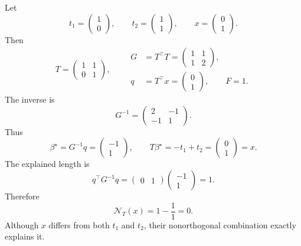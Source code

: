 \documentclass[10pt,twocolumn]{article}
\newcommand{\nov}{\mathcal N}
\begin{document}
Let
\begin{equation}
t_1=\begin{pmatrix}1\\0\end{pmatrix},
\qquad
t_2=\begin{pmatrix}1\\1\end{pmatrix},
\qquad
x=\begin{pmatrix}0\\1\end{pmatrix}.
\end{equation}
Then
\begin{equation}
T=\begin{pmatrix}1&1\\0&1\end{pmatrix},
\qquad
\begin{aligned}
G&=T^\top T=\begin{pmatrix}1&1\\1&2\end{pmatrix},\\
q&=T^\top x=\begin{pmatrix}0\\1\end{pmatrix},
\qquad F=1.
\end{aligned}
\end{equation}
The inverse is
\begin{equation}
G^{-1}=\begin{pmatrix}2&-1\\-1&1\end{pmatrix}.
\end{equation}
Thus
\begin{equation}
\beta^\star=G^{-1}q
=\begin{pmatrix}-1\\1\end{pmatrix},
\qquad
T\beta^\star
= -t_1+t_2
=\begin{pmatrix}0\\1\end{pmatrix}=x.
\end{equation}
The explained length is
\begin{equation}
q^\top G^{-1}q
=\begin{pmatrix}0&1\end{pmatrix}
\begin{pmatrix}-1\\1\end{pmatrix}
=1.
\end{equation}
Therefore
\begin{equation}
\nov_T(x)=1-\frac{1}{1}=0.
\end{equation}
Although $x$ differs from both $t_1$ and $t_2$, their nonorthogonal combination exactly explains it.
\end{document}

